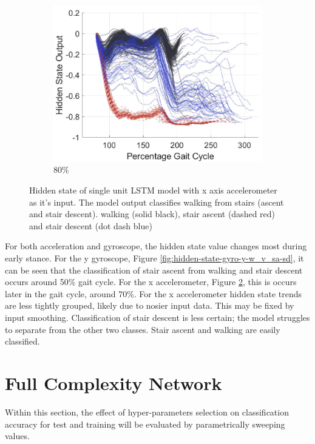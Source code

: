 \documentclass[sensors,article,submit,moreauthors,pdftex]{Definitions/mdpi}
\begin{document}
\begin{figure}[!hbt]
     \begin{subfigure}[b]{0.32\textwidth}
         \centering
         \includegraphics[width=\textwidth]{Figures/results/hidden_state/accel_x_w_v_sa-sd/80_Participant_04.jpg}
         \caption{80\%}
         \label{subfig:e}
     \end{subfigure}
    \caption{Hidden state of single unit LSTM model with x axis accelerometer as it's input. The model output classifies walking from stairs (ascent and stair descent). walking (solid black), stair ascent (dashed red) and stair descent (dot dash blue)}
    \label{fig:hidden-state-accel-x-w_v_sa-sd}
\end{figure}

For both acceleration and gyroscope, the hidden state value changes most during early stance. For the y gyroscope, Figure \ref{fig:hidden-state-gyro-y-w_v_sa-sd}, it can be seen that the classification of stair ascent from walking and stair descent occurs around 50\% gait cycle. For the x accelerometer, Figure \ref{fig:hidden-state-accel-x-w_v_sa-sd}, this is occurs later in the gait cycle, around 70\%. For the x accelerometer hidden state trends are less tightly grouped, likely due to nosier input data. This may be fixed by input smoothing. Classification of stair descent is less certain; the model struggles to separate from the other two classes. Stair ascent and walking are easily classified.

\section{Full Complexity Network}
\label{sec:full_complexity}
 Within this section, the effect of hyper-parameters selection on classification accuracy for test and training will be evaluated by parametrically sweeping values.
\end{document}
